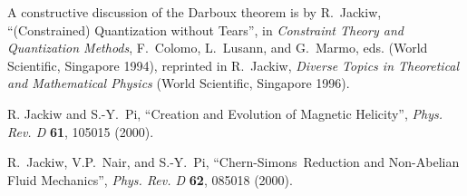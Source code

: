 \documentclass[a4paper,12pt,twoside]{article}
\newcommand{\CS}{Chern-Simons}
\def\Journal#1#2#3#4{{\em #1} {\bf #2}, #3 (#4)}
\def\Book#1#2#3#4{{\em #1}  (#2, #3 #4)}
\def\Bookeds#1#2#3#4#5{{\em #1}, #2  (#3, #4 #5)}
\def\PRD{Phys. Rev. D}
\begin{document}
\begin{thebibliography}{99}
A constructive discussion of the Darboux theorem is by R.~Jackiw, ``(Constrained)
Quantization without Tears'', in 
\Bookeds{Constraint Theory and Quantization Methods}{F.~Colomo,
L.~Lusann, and G.~Marmo, eds.}{World Scientific}{Singapore}{1994}, reprinted in
R.~Jackiw,
\Book{Diverse Topics in Theoretical and Mathematical Physics}{World
Scientific}{Singapore}{1996}.

R. Jackiw and S.-Y.~Pi, ``Creation and Evolution of Magnetic Helicity'',
\Journal{\PRD}{61}{105015}{2000}.

 R.~Jackiw, V.P.~Nair, and S.-Y.~Pi, ``\CS\
Reduction and Non-Abelian Fluid Mechanics'', \Journal{\PRD}{62}{085018}{2000}.


\end{thebibliography}
\end{document}
